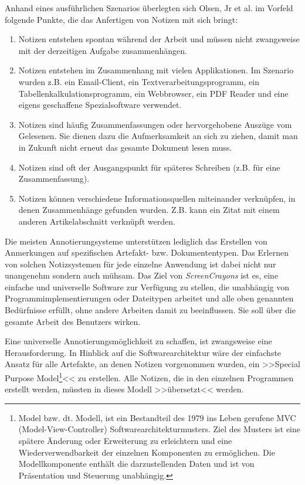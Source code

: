 \medskip {}Anhand eines ausführlichen Szenarios überlegten sich Olsen, Jr et al. im Vorfeld folgende Punkte, die das Anfertigen von Notizen mit sich bringt:

\begin{enumerate}
	\item Notizen entstehen spontan während der Arbeit und müssen nicht zwangsweise mit der derzeitigen Aufgabe zusammenhängen.
	\item Notizen entstehen im Zusammenhang mit vielen Applikationen. Im Szenario wurden z.B. ein Email-Client, ein Textverarbeitungsprogramm, ein Tabellenkalkulationsprogramm, ein Webbrowser, ein \ac{PDF} Reader und eine eigens geschaffene Spezialsoftware verwendet.
	\item Notizen sind häufig Zusammenfassungen oder hervorgehobene Auszüge vom Gelesenen. Sie dienen dazu die Aufmerksamkeit an sich zu ziehen, damit man in Zukunft nicht erneut das gesamte Dokument lesen muss.
	\item Notizen sind oft der Ausgangspunkt für späteres Schreiben (z.B. für eine Zusammenfassung).
	\item Notizen können verschiedene Informationsquellen miteinander verknüpfen, in denen Zusammenhänge gefunden wurden. Z.B. kann ein Zitat mit einem anderen Artikelabschnitt verknüpft werden.
\end{enumerate}

Die meisten Annotierungsysteme unterstützen lediglich das Erstellen von Anmerkungen auf spezifischen Artefakt- bzw. Dokumententypen. Das Erlernen von solchen Notizsystemen für jede einzelne Anwendung ist dabei nicht nur unangenehm sondern auch mühsam. Das Ziel von \emph{ScreenCrayons} ist es, eine einfache und universelle Software zur Verfügung zu stellen, die unabhängig von Programmimplementierungen oder Dateitypen arbeitet und alle oben genannten Bedürfnisse erfüllt, ohne andere Arbeiten damit zu beeinflussen. Sie soll über die gesamte Arbeit des Benutzers wirken.

\medskip Eine universelle Annotierungsmöglichkeit zu schaffen, ist zwangsweise eine Herausforderung. In Hinblick auf die Softwarearchitektur wäre der einfachste Ansatz für alle Artefakte, an denen Notizen vorgenommen wurden, ein >>Special Purpose Model\footnote{Model bzw. dt. Modell, ist ein Bestandteil des 1979 ins Leben gerufene MVC (Model-View-Controller) Softwarearchitekturmusters. Ziel des Musters ist eine spätere Änderung oder Erweiterung zu erleichtern und eine Wiederverwendbarkeit der einzelnen Komponenten zu ermöglichen. Die Modellkomponente enthält die darzustellenden Daten und ist von Präsentation und Steuerung unabhängig.}<< zu erstellen. Alle Notizen, die in den einzelnen Programmen erstellt werden, müssten in dieses Modell >>übersetzt<< werden. 

